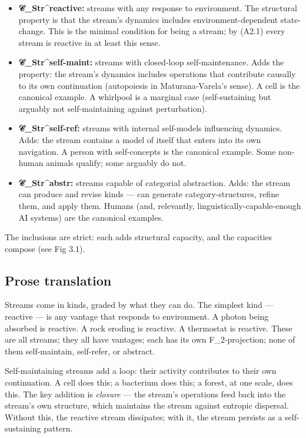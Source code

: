 \documentclass[11pt, openany]{book}
\begin{document}
\begin{itemize}
\item \textbf{𝒞\_\allowbreak{}Str\textasciicircum{}reactive:} streams with any response to environment. The structural property is that the stream's dynamics includes environment-dependent state-change. This is the minimal condition for being a stream; by (A2.1) every stream is reactive in at least this sense.
\item \textbf{𝒞\_\allowbreak{}Str\textasciicircum{}self-maint:} streams with closed-loop self-maintenance. Adds the property: the stream's dynamics includes operations that contribute causally to its own continuation (autopoiesis in Maturana-Varela's sense). A cell is the canonical example. A whirlpool is a marginal case (self-sustaining but arguably not self-maintaining against perturbation).
\item \textbf{𝒞\_\allowbreak{}Str\textasciicircum{}self-ref:} streams with internal self-models influencing dynamics. Adds: the stream contains a model of itself that enters into its own navigation. A person with self-concepts is the canonical example. Some non-human animals qualify; some arguably do not.
\item \textbf{𝒞\_\allowbreak{}Str\textasciicircum{}abstr:} streams capable of categorial abstraction. Adds: the stream can produce and revise kinds --- can generate category-structures, refine them, and apply them. Humans (and, relevantly, linguistically-capable-enough AI systems) are the canonical examples.
\end{itemize}

The inclusions are strict: each adds structural capacity, and the capacities compose (see Fig 3.1).

\subsection{Prose translation}

Streams come in kinds, graded by what they can do. The simplest kind --- reactive --- is any vantage that responds to environment. A photon being absorbed is reactive. A rock eroding is reactive. A thermostat is reactive. These are all streams; they all have vantages; each has its own F\_\allowbreak{}2-projection; none of them self-maintain, self-refer, or abstract.

Self-maintaining streams add a loop: their activity contributes to their own continuation. A cell does this; a bacterium does this; a forest, at one scale, does this. The key addition is \textit{closure} --- the stream's operations feed back into the stream's own structure, which maintains the stream against entropic dispersal. Without this, the reactive stream dissipates; with it, the stream persists as a self-sustaining pattern.
\end{document}
